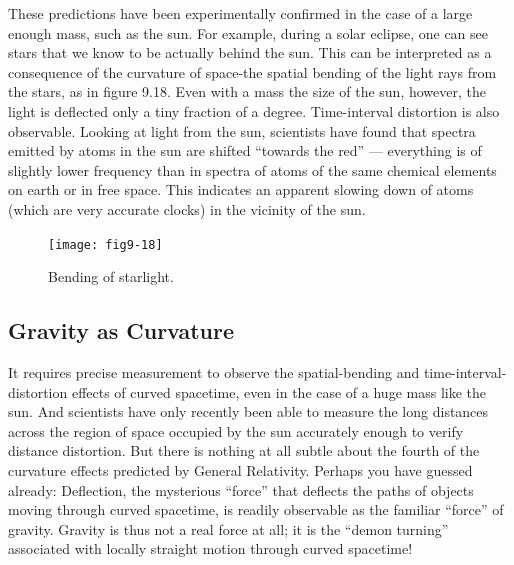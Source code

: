 \documentclass{book}
\begin{document}
These predictions have been experimentally confirmed in the case of a
large enough mass, such as the sun. For example, during a solar eclipse,
one can see stars that we know to be actually behind the sun. This can
be interpreted as a consequence of the curvature of space-the spatial
bending of the light rays from the stars, as in figure 9.18. Even with
a mass the size of the sun, however, the light is deflected only a tiny
fraction of a degree. Time-interval distortion is also observable. Looking
at light from the sun, scientists have found that spectra emitted by
atoms in the sun are shifted ``towards the red'' --- everything is of slightly
lower frequency than in spectra of atoms of the same chemical elements
on earth or in free space. This indicates an apparent slowing down of
atoms (which are very accurate clocks) in the vicinity of the sun.

\begin{figure}
\begin{center}
\texttt{[image: fig9-18]}
\caption{Bending of starlight.}
\end{center}
\end{figure}

\subsection{Gravity as Curvature}

It requires precise measurement to observe the spatial-bending and time-interval-distortion effects of curved spacetime, even in the case of a
huge mass like the sun. And scientists have only recently been able
to measure the long distances across the region of space occupied by
the sun accurately enough to verify distance distortion. But there is
nothing at all subtle about the fourth of the curvature effects predicted
by General Relativity. Perhaps you have guessed already: Deflection,
the mysterious ``force'' that deflects the paths of objects moving through
curved spacetime, is readily observable as the familiar ``force'' of gravity.
Gravity is thus not a real force at all; it is the ``demon turning'' associated
with locally straight motion through curved spacetime!
\end{document}
